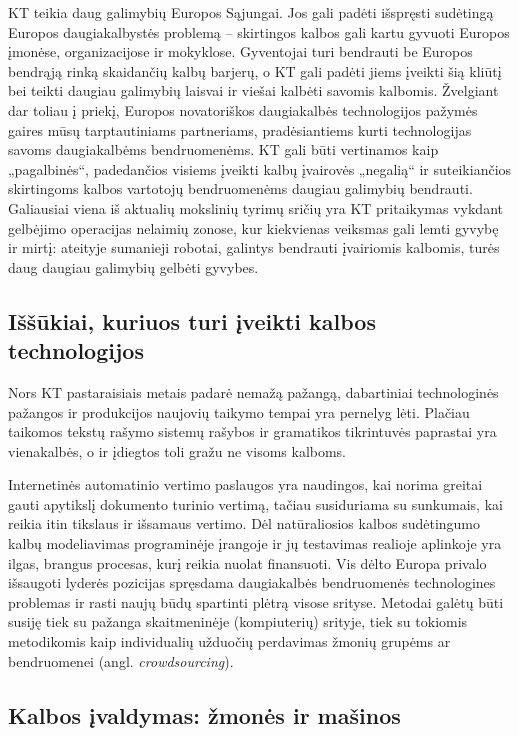 \begin{multicols}{2}
KT teikia daug galimybių Europos Sąjungai. Jos gali padėti išspręsti sudėtingą Europos daugiakalbystės problemą – skirtingos kalbos gali kartu gyvuoti Europos įmonėse, organizacijose ir mokyklose. Gyventojai turi bendrauti be Europos bendrąją rinką skaidančių kalbų barjerų, o KT gali padėti jiems įveikti šią  kliūtį bei teikti daugiau galimybių laisvai ir viešai kalbėti savomis kalbomis. Žvelgiant dar toliau į priekį, Europos novatoriškos daugiakalbės technologijos pažymės gaires mūsų tarptautiniams partneriams, pradėsiantiems kurti technologijas savoms daugiakalbėms bendruomenėms. KT gali būti vertinamos kaip „pagalbinės“, padedančios visiems įveikti kalbų įvairovės „negalią“ ir suteikiančios skirtingoms kalbos vartotojų bendruomenėms daugiau galimybių bendrauti. Galiausiai viena iš aktualių mokslinių tyrimų sričių yra KT pritaikymas vykdant gelbėjimo operacijas nelaimių zonose, kur kiekvienas veiksmas gali lemti gyvybę ir mirtį: ateityje sumanieji robotai, galintys bendrauti įvairiomis kalbomis, turės daug daugiau galimybių gelbėti gyvybes. 

\subsection{Iššūkiai, kuriuos turi įveikti kalbos technologijos}

Nors KT pastaraisiais metais padarė nemažą pažangą, dabartiniai technologinės pažangos ir produkcijos naujovių taikymo tempai yra pernelyg lėti. Plačiau taikomos tekstų rašymo sistemų rašybos ir gramatikos tikrintuvės paprastai yra vienakalbės, o ir įdiegtos toli gražu ne visoms kalboms.


Internetinės automatinio vertimo paslaugos yra naudingos, kai norima greitai gauti apytikslį dokumento turinio vertimą, tačiau susiduriama su sunkumais, kai reikia itin tikslaus ir išsamaus vertimo. Dėl natūraliosios kalbos sudėtingumo kalbų modeliavimas programinėje įrangoje ir jų testavimas realioje aplinkoje yra ilgas, brangus procesas, kurį reikia nuolat finansuoti. Vis dėlto Europa privalo išsaugoti lyderės pozicijas spręsdama daugiakalbės bendruomenės technologines problemas ir rasti naujų būdų spartinti plėtrą visose srityse. Metodai galėtų būti susiję tiek su pažanga skaitmeninėje (kompiuterių) srityje, tiek su tokiomis metodikomis kaip individualių užduočių perdavimas žmonių grupėms ar bendruomenei (angl. \textit{crowdsourcing}).

\subsection{Kalbos įvaldymas: žmonės ir mašinos}


\end{multicols}
